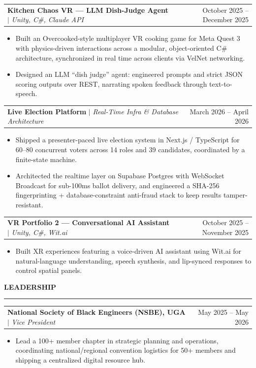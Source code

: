 \documentclass[letterpaper,10pt]{article}
\makeatletter
\newcommand{\sectiontitle}[1]{%
  \vspace{6pt}%
  {\textbf{\large #1}}\par
  \vspace{-6pt}%
  \rule{\textwidth}{0.4pt}\par
  \vspace{3pt}%
}
\newcommand{\experienceheading}[4]{%
  \begin{tabularx}{\textwidth}{@{}X r@{}}%
    \textbf{#1} $|$ \textit{#2} & #4 \\%
  \end{tabularx}\par
  \vspace{1.5pt}%
}
\newcommand{\projectheading}[3]{%
  \begin{tabularx}{\textwidth}{@{}X r@{}}
    \textbf{#1} $|$ \textit{#2} & #3 \\
  \end{tabularx}\par
  \vspace{1.5pt}%
}
\makeatother
\begin{document}
\projectheading{Kitchen Chaos VR --- LLM Dish-Judge Agent}{Unity, C\#, Claude API}{October 2025 -- December 2025}
\begin{itemize}
    \item Built an Overcooked-style multiplayer VR cooking game for Meta Quest 3 with physics-driven interactions across a modular, object-oriented C\# architecture, synchronized in real time across clients via VelNet networking.
    \item Designed an LLM ``dish judge'' agent: engineered prompts and strict JSON scoring outputs over REST, narrating spoken feedback through text-to-speech.
\end{itemize}

\projectheading{Live Election Platform}{Real-Time Infra \& Database Architecture}{March 2026 -- April 2026}
\begin{itemize}
    \item Shipped a presenter-paced live election system in Next.js / TypeScript for 60--80 concurrent voters across 14 roles and 39 candidates, coordinated by a finite-state machine.
    \item Architected the realtime layer on Supabase Postgres with WebSocket Broadcast for sub-100ms ballot delivery, and engineered a SHA-256 fingerprinting + database-constraint anti-fraud stack to keep results tamper-resistant.
\end{itemize}

\projectheading{VR Portfolio 2 --- Conversational AI Assistant}{Unity, C\#, Wit.ai}{October 2025 -- November 2025}
\begin{itemize}
    \item Built XR experiences featuring a voice-driven AI assistant using Wit.ai for natural-language understanding, speech synthesis, and lip-synced responses to control spatial panels.
\end{itemize}

\sectiontitle{LEADERSHIP}
\experienceheading{National Society of Black Engineers (NSBE), UGA}{Vice President}{Athens, GA}{May 2025 -- May 2026}
\begin{itemize}
    \item Lead a 100+ member chapter in strategic planning and operations, coordinating national/regional convention logistics for 50+ members and shipping a centralized digital resource hub.
\end{itemize}
\end{document}
